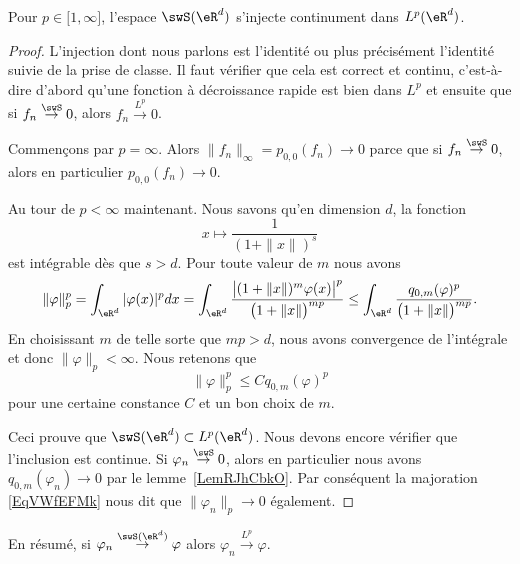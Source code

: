 \begin{proposition}     \label{PropGNXBeME}
    Pour \( p\in\mathopen[ 1 , \infty \mathclose]\), l'espace \( \swS(\eR^d)\) s'injecte continument dans \( L^p(\eR^d)\).
\end{proposition}

\begin{proof}
    L'injection dont nous parlons est l'identité ou plus précisément l'identité suivie de la prise de classe. Il faut vérifier que cela est correct et continu, c'est-à-dire d'abord qu'une fonction à décroissance rapide est bien dans \( L^p\) et ensuite que si \( f_n\stackrel{\swS}{\to}0\), alors \( f_n\stackrel{L^p}{\to}0\).

    Commençons par \( p=\infty\). Alors \( \| f_n \|_{\infty}=p_{0,0}(f_n)\to 0\) parce que si \( f_n\stackrel{\swS}{\to}0\), alors en particulier \( p_{0,0}(f_n)\to 0\).

    Au tour de \( p<\infty\) maintenant. Nous savons qu'en dimension \( d\), la fonction
    \begin{equation}
        x\mapsto \frac{1}{ (1+\| x \|)^s }
    \end{equation}
    est intégrable dès que \( s>d\).
    Pour toute valeur de \( m\) nous avons
    \begin{equation}
        \| \varphi \|_p^p=\int_{\eR^d}| \varphi(x) |^pdx=\int_{\eR^d}\frac{ \big|    (1+\| x \|)^m\varphi(x)   \big|^p }{ \big( 1+\| x \| \big)^{mp} }\leq\int_{\eR^d}\frac{q_{0,m}(\varphi)^p}{ \big( 1+\| x \| \big)^{mp} }.
    \end{equation}
    En choisissant \( m\) de telle sorte que \( mp>d\), nous avons convergence de l'intégrale et donc \( \| \varphi \|_p<\infty\). Nous retenons que
    \begin{equation}    \label{EqVWfEFMk}
        \| \varphi \|_p^p\leq Cq_{0,m}(\varphi)^p
    \end{equation}
    pour une certaine constance \( C\) et un bon choix de \( m\).

    Ceci prouve que \( \swS(\eR^d)\subset L^p(\eR^d)\). Nous devons encore vérifier que l'inclusion est continue. Si \( \varphi_n\stackrel{\swS}{\to}0\), alors en particulier nous avons \( q_{0,m}(\varphi_n)\to 0\) par le lemme~\ref{LemRJhCbkO}. Par conséquent la majoration \eqref{EqVWfEFMk} nous dit que \( \| \varphi_n \|_p\to 0\) également.

\end{proof}
En résumé, si \( \varphi_n\stackrel{\swS(\eR^d)}{\to}\varphi\) alors \( \varphi_n\stackrel{L^p}{\to}\varphi\).

